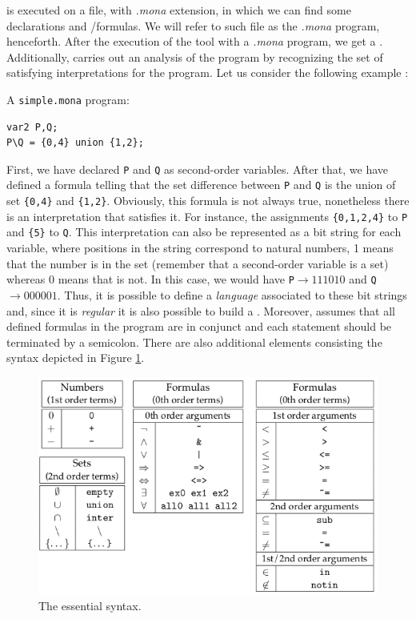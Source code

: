 \MONA is executed on a file, with \textit{.mona} extension, in which we can find some declarations and \wsos/\wsts formulas. We will refer to such file as the \textit{.mona} program, henceforth. After the execution of the tool with a \textit{.mona} program, we get a \DFA. Additionally, \MONA carries out an analysis of the program by recognizing the set of satisfying interpretations for the program. Let us consider the following example \citep{monamanual2001}:
\begin{example}
A \texttt{simple.mona} program:\\
\begin{lstlisting}[style=Mona, escapechar = £]
var2 P,Q;
P\Q = {0,4} union {1,2};
\end{lstlisting}
\end{example}
First, we have declared \texttt{P} and \texttt{Q} as second-order variables. After that, we have defined a formula telling that the set difference between \texttt{P} and \texttt{Q} is the union of set \texttt{\{0,4\}} and \texttt{\{1,2\}}. Obviously, this formula is not always true, nonetheless there is an interpretation that satisfies it. For instance, the assignments \texttt{\{0,1,2,4\}} to \texttt{P} and \texttt{\{5\}} to \texttt{Q}. This interpretation can also be represented as a bit string for each variable, where positions in the string correspond to natural numbers, 1 means that the number is in the set (remember that a second-order variable is a set) whereas 0 means that is not. In this case, we would have \texttt{P}$ \rightarrow 111010$ and \texttt{Q}$ \rightarrow 000001$. Thus, it is possible to define a \textit{language} associated to these bit strings and, since it is \textit{regular} it is also possible to build a \DFA. Moreover, \MONA assumes that all defined formulas in the program are in conjunct and each statement should be terminated by a semicolon.
There are also additional elements consisting the \MONA syntax depicted in Figure \ref{fig:mona-syntax}.
\begin{figure}[h]
	\centering
	\includegraphics[width=\textwidth]{images/mona-syntax}
	\caption{The essential \MONA syntax.}
	\label{fig:mona-syntax}
\end{figure}
